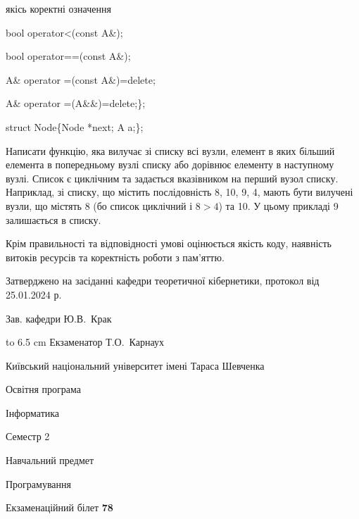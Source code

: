 \documentclass[12pt, ukrainian]{article}
\begin{document}
{\quad  якісь коректні означення 

\quad  bool operator<(const A\&); 

\quad  bool operator==(const A\&); 

\quad A\& operator =(const A\&)=delete; 

\quad  A\& operator =(A\&\&)=delete;\};

struct Node\{Node *next; A a;\};

 Написати функцію, яка вилучає зі списку всі вузли, елемент в яких більший елемента в попередньому вузлі списку або дорівнює елементу в наступному вузлі. Список є циклічним та задається вказівником на перший вузол списку. Наприклад, зі списку, що містить послідовність 8, 10, 9, 4, мають бути вилучені вузли, що містять 8 (бо список циклічний і $8>4$) та 10. У цьому прикладі 9 залишається в списку.

Крім правильності та відповідності умові оцінюється якість коду, наявність витоків ресурсів та коректність роботи з пам'яттю. 

}
{\smallskip\smallskip \begin {scriptsize} Затверджено на засіданні кафедри теоретичної кібернетики, протокол   від   25.01.2024 р.\par\smallskip\smallskip\smallskip\smallskip
{\parbox {6.5 cm} {Зав. кафедри \dotfill Ю.В.~Крак}}\hspace {0.7cm} {\hbox to 6.5 cm { Екзаменатор \dotfill Т.О.~Карнаух}} \end{scriptsize}}
\newpage
{{\begin {scriptsize}\par
{ \center  Київський національний університет імені Тараса Шевченка \par}
{\parbox {5 cm}{Освітня програма \hfill}{\parbox {7 cm}{Інформатика\hfill}}\parbox {6 cm}{\hfill Семестр 2}}\par
{\parbox {5 cm} {Навчальний предмет \hfill}\parbox {7 cm}{Програмування \hfill}\parbox {6cm}{\hfill}\par}\vspace{-15pt} \end{scriptsize}}{\center Екзаменаційний білет \No \textbf { 78 }\par}}
\end{document}

